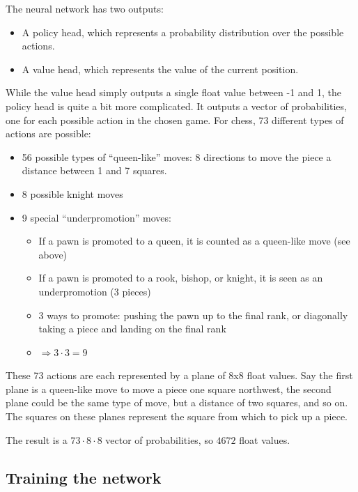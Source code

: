 \documentclass{article}
\begin{document}
The neural network has two outputs:

\begin{itemize}
    \item A policy head, which represents a probability distribution over the possible actions.
    \item A value head, which represents the value of the current position.
\end{itemize}

While the value head simply outputs a single float value between -1 and 1, the policy head is quite a bit more complicated.
It outputs a vector of probabilities, one for each possible action in the chosen game. 
For chess, 73 different types of actions are possible:

\begin{itemize}
    \item 56 possible types of ``queen-like'' moves: 8 directions to move the piece a distance between 1 and 7 squares.
    \item 8 possible knight moves
    \item 9 special ``underpromotion'' moves:
    \begin{itemize}
        \item If a pawn is promoted to a queen, it is counted as a queen-like move (see above)
        \item If a pawn is promoted to a rook, bishop, or knight, it is seen as an underpromotion (3 pieces)
        \item 3 ways to promote: pushing the pawn up to the final rank, or diagonally taking a piece and landing on the final rank
        \item $\Rightarrow 3 \cdot 3 = 9$
    \end{itemize}
\end{itemize}

These 73 actions are each represented by a plane of 8x8 float values. Say the first plane is a queen-like move
to move a piece one square northwest, the second plane could be the same type of move, but a distance of two squares, and so on.
The squares on these planes represent the square from which to pick up a piece. 


The result is a $73 \cdot 8 \cdot 8$ vector of probabilities, so $4672$ float values.  

\subsection{Training the network}
\end{document}
